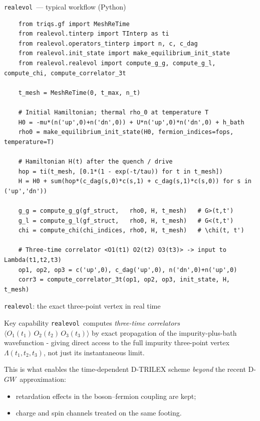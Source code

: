 \documentclass[10pt,aspectratio=169]{beamer}
\newcommand{\Lam}{\Lambda}
\newcommand{\dgw}{D\nobreakdash-$GW$}
\newcommand{\realevol}{\texttt{realevol}}
\begin{document}
\begin{frame}[fragile]{\realevol\ — typical workflow (Python)}
    \begin{lstlisting}
    from triqs.gf import MeshReTime
    from realevol.tinterp import TInterp as ti
    from realevol.operators_tinterp import n, c, c_dag
    from realevol.init_state import make_equilibrium_init_state
    from realevol.realevol import compute_g_g, compute_g_l, compute_chi, compute_correlator_3t

    t_mesh = MeshReTime(0, t_max, n_t)

    # Initial Hamiltonian; thermal rho_0 at temperature T
    H0 = -mu*(n('up',0)+n('dn',0)) + U*n('up',0)*n('dn',0) + h_bath
    rho0 = make_equilibrium_init_state(H0, fermion_indices=fops, temperature=T)

    # Hamiltonian H(t) after the quench / drive
    hop = ti(t_mesh, [0.1*(1 - exp(-t/tau)) for t in t_mesh])
    H = H0 + sum(hop*(c_dag(s,0)*c(s,1) + c_dag(s,1)*c(s,0)) for s in ('up','dn'))

    g_g = compute_g_g(gf_struct,   rho0, H, t_mesh)   # G>(t,t')
    g_l = compute_g_l(gf_struct,   rho0, H, t_mesh)   # G<(t,t')
    chi = compute_chi(chi_indices, rho0, H, t_mesh)   # \chi(t, t')

    # Three-time correlator <O1(t1) O2(t2) O3(t3)> -> input to Lambda(t1,t2,t3)
    op1, op2, op3 = c('up',0), c_dag('up',0), n('dn',0)+n('up',0)
    corr3 = compute_correlator_3t(op1, op2, op3, init_state, H, t_mesh)
    \end{lstlisting}
\end{frame}

\begin{frame}{\realevol: the exact three-point vertex in real time}
    \begin{block}{Key capability}
        \realevol\ computes \emph{three-time correlators}
        $\langle O_1(t_1)\,O_2(t_2)\,O_3(t_3)\rangle$ by exact
        propagation of the impurity-plus-bath wavefunction - giving
        direct access to the full impurity three-point vertex
        $\Lam(t_1,t_2,t_3)$, not just its instantaneous limit.
    \end{block}

    \medskip
    This is what enables the time-dependent D-TRILEX scheme \emph{beyond}
    the recent \dgw\ approximation:
    \begin{itemize}
        \item retardation effects in the boson--fermion coupling are kept;
        \item charge and spin channels treated on the same footing.
    \end{itemize}
\end{frame}
\end{document}

